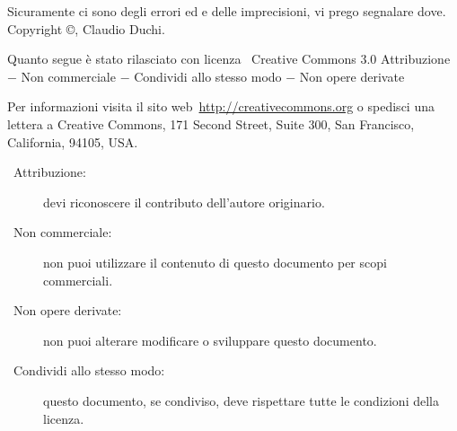 Sicuramente ci sono degli errori ed e delle imprecisioni, vi  prego segnalare dove.
\vfill
Copyright \copyright\@ \the\year, Claudio Duchi.


Quanto segue è stato rilasciato con licenza \ccLogo\ Creative Commons   3.0 Attribuzione $-$ Non commerciale $-$ Condividi allo stesso modo $-$ Non opere derivate

Per informazioni visita il sito web\ \url{http://creativecommons.org} o spedisci una lettera a Creative Commons, 171 Second Street, Suite 300, San Francisco, California, 94105, USA.

\begin{description}
\item[\ccAttribution\ Attribuzione:] devi riconoscere il contributo dell'autore originario.
\item [\ccNonCommercial\ Non commerciale:] non puoi utilizzare il contenuto di questo documento per scopi commerciali.
\item [\ccNoDerivatives\ Non opere derivate:]  non puoi alterare modificare o sviluppare questo documento.
\item [\ccShareAlike\ Condividi allo stesso modo:]  questo documento, se condiviso, deve rispettare tutte le condizioni della licenza.
\end{description}

